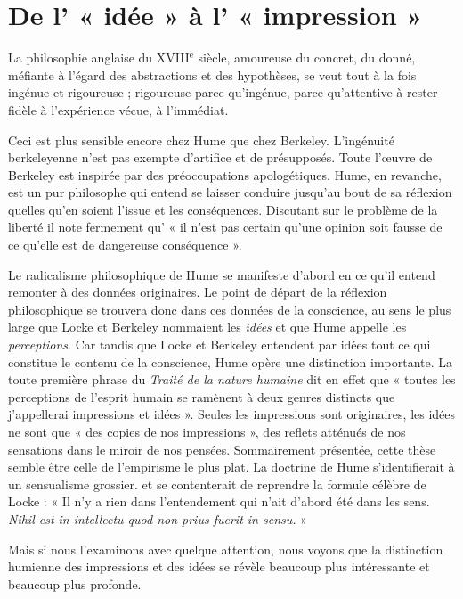 
\section{De l’ « idée » à l’ « impression »}
%
La philosophie anglaise du {\footnotesize XVIII}$^\text{e}$ siècle, amoureuse du concret, du donné, méfiante à l’égard des abstractions et
des hypothèses, se veut tout à la fois ingénue et rigoureuse ; rigoureuse parce qu’ingénue, parce qu’attentive à
rester fidèle à l'expérience vécue, à l’immédiat.

Ceci est plus sensible encore chez Hume que chez
Berkeley. L’ingénuité berkeleyenne n’est pas exempte
d'artifice et de présupposés. Toute l’œuvre de Berkeley
est inspirée par des préoccupations apologétiques. Hume,
en revanche, est un pur philosophe qui entend se laisser
conduire jusqu’au bout de sa réflexion quelles qu’en
soient l’issue et les conséquences. Discutant sur le problème
de la liberté il note fermement qu’ « il n’est pas certain
qu’une opinion soit fausse de ce qu’elle est de dangereuse
conséquence ».

Le radicalisme philosophique de Hume se manifeste
d’abord en ce qu’il entend remonter à des données originaires. Le point de départ de la réflexion philosophique
se trouvera donc dans ces données de la conscience, au
sens le plus large que Locke et Berkeley nommaient les
{\it idées} et que Hume appelle les {\it perceptions}. Car tandis que
Locke et Berkeley entendent par idées tout ce qui constitue
le contenu de la conscience, Hume opère une distinction
importante. La toute première phrase du {\it Traité de la nature
humaine} dit en effet que « toutes les perceptions de
l'esprit humain se ramènent à deux genres distincts que
j’appellerai impressions et idées ». Seules les impressions
sont originaires, les idées ne sont que « des copies de nos
impressions », des reflets atténués de nos sensations dans
le miroir de nos pensées. Sommairement présentée, cette
thèse semble être celle de l’empirisme le plus plat. La
doctrine de Hume s’identifierait à un sensualisme grossier.
et se contenterait de reprendre la formule célèbre de
Locke : « Il n’y a rien dans l’entendement qui n’ait d’abord
été dans les sens. {\it Nihil est in intellectu quod non prius fuerit in sensu.} »

Mais si nous l’examinons avec quelque attention, nous
voyons que la distinction humienne des impressions et
des idées se révèle beaucoup plus intéressante et beaucoup
plus profonde.

